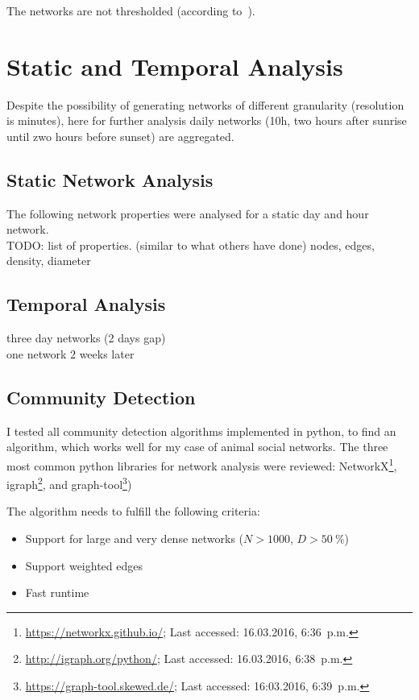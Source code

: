 The networks are not thresholded (according to~\cite{farine2015constructing}).

\section{Static and Temporal Analysis}

Despite the possibility of generating networks of different granularity (resolution is minutes), here for further analysis daily networks (10h, two hours after sunrise until zwo hours before sunset) are aggregated.


\textcite{wey2008social}

\subsection{Static Network Analysis}
The following network properties were analysed for a static day and hour network.\\
TODO: list of properties. (similar to what others have done)
nodes, edges, density, diameter\\


\subsection{Temporal Analysis}
three day networks (2 days gap)\\
one network 2 weeks later\\

\subsection{Community Detection}
I tested all community detection algorithms implemented in python, to find an algorithm, which works well for my case of animal social networks. The three most common python libraries for network analysis were reviewed: NetworkX\footnote{\url{https://networkx.github.io/}; Last accessed: 16.03.2016, 6:36~p.m.}, igraph\footnote{\url{http://igraph.org/python/}; Last accessed: 16.03.2016, 6:38~p.m.}, and graph-tool\footnote{\url{https://graph-tool.skewed.de/}; Last accessed: 16:03.2016, 6:39~p.m.})

The algorithm needs to fulfill the following criteria:

\begin{itemize}
\item Support for large and very dense networks ($N>1000$, $D>50~\%$)
\item Support weighted edges
\item Fast runtime
\end{itemize}


